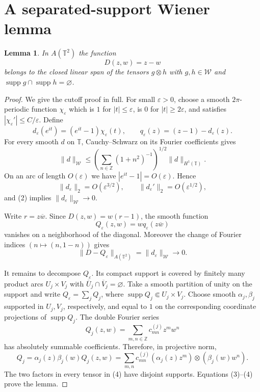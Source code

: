 \documentclass[10pt]{article}
\newtheorem{lemma}[theorem]{Lemma}
\newcommand{\TT}{\mathbb T}
\newcommand{\W}{\mathcal W}
\newcommand{\supp}{\operatorname{supp}}
\begin{document}
\section*{A separated-support Wiener lemma}

\begin{lemma}\label{lem:wiener}
In $A(\TT^2)$ the function
\[
 D(z,w)=z-w
\]
belongs to the closed linear span of the tensors $g\otimes h$ with
$g,h\in\W$ and $\supp g\cap\supp h=\varnothing$.
\end{lemma}

\begin{proof}
We give the cutoff proof in full.  For small $\varepsilon>0$, choose a smooth
$2\pi$-periodic function $\chi_\varepsilon$ which is $1$ for
$|t|\leq\varepsilon$, is $0$ for $|t|\geq2\varepsilon$, and satisfies
$|\chi_\varepsilon'|\leq C/\varepsilon$.  Define
\[
 d_\varepsilon(e^{it})=(e^{it}-1)\chi_\varepsilon(t),\qquad
 q_\varepsilon(z)=(z-1)-d_\varepsilon(z).
\]
For every smooth $d$ on $\TT$, Cauchy--Schwarz on its Fourier coefficients
gives
\[
 \|d\|_{\W}\leq
 \left(\sum_{n\in\mathbb Z}(1+n^2)^{-1}\right)^{1/2}
 \|d\|_{H^1(\TT)}.                                         \tag{2}
\]
On an arc of length $O(\varepsilon)$ we have
$|e^{it}-1|=O(\varepsilon)$.  Hence
\[
 \|d_\varepsilon\|_2=O(\varepsilon^{3/2}),\qquad
 \|d_\varepsilon'\|_2=O(\varepsilon^{1/2}),
\]
and (2) implies $\|d_\varepsilon\|_{\W}\to0$.

Write $r=z\overline w$.  Since $D(z,w)=w(r-1)$, the smooth function
\[
 Q_\varepsilon(z,w)=wq_\varepsilon(z\overline w)
\]
vanishes on a neighborhood of the diagonal.  Moreover the change of Fourier
indices $(n\mapsto(n,1-n))$ gives
\[
 \|D-Q_\varepsilon\|_{A(\TT^2)}
 =\|d_\varepsilon\|_{\W}\longrightarrow0.                 \tag{3}
\]

It remains to decompose $Q_\varepsilon$.  Its compact support is covered by
finitely many product arcs $U_j\times V_j$ with
$\overline U_j\cap\overline V_j=\varnothing$.  Take a smooth partition of
unity on the support and write
$Q_\varepsilon=\sum_j Q_j$, where
$\supp Q_j\Subset U_j\times V_j$.  Choose smooth $\alpha_j,\beta_j$ supported
in $U_j,V_j$, respectively, and equal to $1$ on the corresponding coordinate
projections of $\supp Q_j$.  The double Fourier series
\[
 Q_j(z,w)=\sum_{m,n\in\mathbb Z}c^{(j)}_{mn}z^mw^n
\]
has absolutely summable coefficients.  Therefore, in projective norm,
\[
 Q_j=\alpha_j(z)\beta_j(w)Q_j(z,w)
 =\sum_{m,n}c^{(j)}_{mn}
       (\alpha_j(z)z^m)\otimes(\beta_j(w)w^n).              \tag{4}
\]
The two factors in every tensor in (4) have disjoint supports.  Equations
(3)--(4) prove the lemma.
\end{proof}
\end{document}
